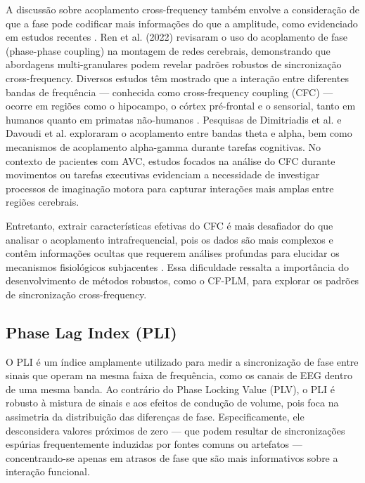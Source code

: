 A discussão sobre acoplamento cross-frequency também envolve a consideração de que a fase pode codificar mais informações do que a amplitude, como evidenciado em estudos recentes \cite{autor2020}. Ren et al. (2022) \cite{ren2022multi} revisaram o uso do acoplamento de fase (phase-phase coupling) na montagem de redes cerebrais, demonstrando que abordagens multi-granulares podem revelar padrões robustos de sincronização cross-frequency. Diversos estudos têm mostrado que a interação entre diferentes bandas de frequência --- conhecida como cross-frequency coupling (CFC) --- ocorre em regiões como o hipocampo, o córtex pré-frontal e o sensorial, tanto em humanos quanto em primatas não-humanos \cite{mormann2005phase, canolty2006high, jensen2007cross, khamechian2020decoding}. Pesquisas de Dimitriadis et al. \cite{dimitriadis2015cognitive} e Davoudi et al. \cite{davoudi2021prefrontal} exploraram o acoplamento entre bandas theta e alpha, bem como mecanismos de acoplamento alpha-gamma durante tarefas cognitivas. No contexto de pacientes com AVC, estudos focados na análise do CFC durante movimentos ou tarefas executivas evidenciam a necessidade de investigar processos de imaginação motora para capturar interações mais amplas entre regiões cerebrais.

Entretanto, extrair características efetivas do CFC é mais desafiador do que analisar o acoplamento intrafrequencial, pois os dados são mais complexos e contêm informações ocultas que requerem análises profundas para elucidar os mecanismos fisiológicos subjacentes \cite{ren2022multi}. Essa dificuldade ressalta a importância do desenvolvimento de métodos robustos, como o CF-PLM, para explorar os padrões de sincronização cross-frequency.

\subsection{Phase Lag Index (PLI)}

O PLI é um índice amplamente utilizado para medir a sincronização de fase entre sinais que operam na mesma faixa de frequência, como os canais de EEG dentro de uma mesma banda. Ao contrário do Phase Locking Value (PLV), o PLI é robusto à mistura de sinais e aos efeitos de condução de volume, pois foca na assimetria da distribuição das diferenças de fase. Especificamente, ele desconsidera valores próximos de zero — que podem resultar de sincronizações espúrias frequentemente induzidas por fontes comuns ou artefatos — concentrando-se apenas em atrasos de fase que são mais informativos sobre a interação funcional.

